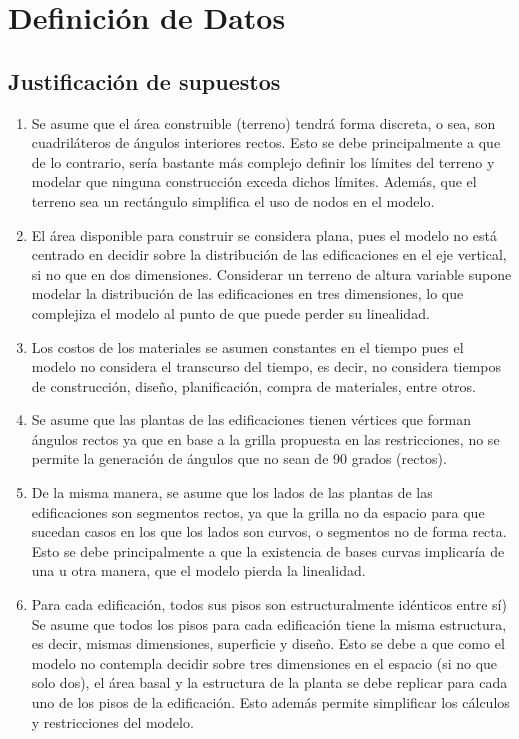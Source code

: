 \documentclass[letterpaper]{article}
\begin{document}
\section{Definición de Datos}
\subsection{Justificación de supuestos}
\begin{enumerate}
	\setlength\itemsep{0.0003em}
	\item Se asume que el área construible (terreno) tendrá forma discreta, o sea, son cuadriláteros de ángulos interiores rectos. Esto se debe principalmente a que de lo contrario, sería bastante más complejo definir los límites del terreno y modelar que ninguna construcción
	exceda dichos límites. Además, que el terreno sea un rectángulo simplifica el uso de nodos en el modelo.
	
	\item El área disponible para construir se considera plana, pues el modelo no está centrado en decidir sobre la distribución de las edificaciones en el eje vertical, si no que en dos dimensiones. Considerar un terreno de altura variable supone modelar la distribución de las
	edificaciones en tres dimensiones, lo que complejiza el modelo al punto de que puede perder su linealidad.
	
	\item Los costos de los materiales se asumen constantes en el tiempo pues el modelo no considera el transcurso del tiempo, es decir, no considera tiempos de construcción, diseño, planificación, compra de materiales, entre otros.

	\item Se asume que las plantas de las edificaciones tienen  vértices que forman ángulos rectos ya que en base a la grilla propuesta en las restricciones, no se permite la generación de ángulos que no sean de 90 grados (rectos).
 
	\item De la misma manera, se asume que los lados de las plantas de las edificaciones son segmentos rectos, ya que la grilla no da espacio para que sucedan casos en los que los lados son curvos, o segmentos no de forma recta. Esto se debe principalmente a que la existencia de bases curvas implicaría de una u otra manera, que el modelo pierda la linealidad.

	\item Para cada edificación, todos sus pisos son estructuralmente idénticos entre sí) Se asume que todos los pisos para cada edificación tiene la misma estructura, es decir, mismas dimensiones, superficie y diseño. Esto se debe a que como el modelo no contempla decidir sobre tres
	dimensiones en el espacio (si no que solo dos), el área basal y la estructura de la planta se debe replicar para cada uno de los pisos de la edificación. Esto además permite simplificar los cálculos y restricciones del modelo.
	

\end{enumerate}
\end{document}

